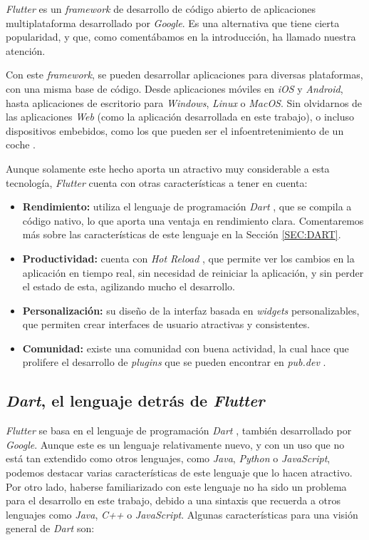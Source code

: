 \textit{Flutter} \cite{flutter} es un \textit{framework} de desarrollo de código abierto de aplicaciones multiplataforma desarrollado 
por \textit{Google}. Es una alternativa que tiene cierta popularidad, y que, como comentábamos en la introducción,
ha llamado nuestra atención.

Con este \textit{framework}, se pueden desarrollar aplicaciones para diversas plataformas, con una misma base de código.
Desde aplicaciones móviles en \textit{iOS} y \textit{Android}, hasta aplicaciones de escritorio para \textit{Windows}, \textit{Linux} o \textit{MacOS}. Sin olvidarnos de
las aplicaciones \textit{Web} (como la aplicación desarrollada en este trabajo), o incluso dispositivos 
embebidos, como los que pueden ser el infoentretenimiento de un coche \cite{flutter_car}. 

Aunque solamente este hecho aporta un atractivo muy considerable a esta tecnología, \textit{Flutter} cuenta con otras características a tener en cuenta:

\begin{itemize}
  \item \textbf{Rendimiento:} utiliza el lenguaje de programación \textit{Dart} \cite{dart}, que se compila a código nativo, lo que aporta una ventaja en rendimiento clara.
   Comentaremos más sobre las características de este lenguaje en la Sección \ref{SEC:DART}.
  \item \textbf{Productividad:} cuenta con \textit{Hot Reload} \cite{hot_reload}, que permite ver los cambios en la aplicación en tiempo real, sin necesidad de reiniciar 
  la aplicación, y sin perder el estado de esta, agilizando mucho el desarrollo.
  \item \textbf{Personalización:} su diseño de la interfaz basada en \textit{widgets} personalizables, que permiten crear interfaces de usuario atractivas y consistentes.
  \item \textbf{Comunidad:} existe una comunidad con buena actividad, la cual hace que prolifere el desarrollo de \textit{plugins} que se pueden encontrar en \textit{pub.dev} \cite{pub_dev}.
\end{itemize}


\subsection{\textit{Dart}, el lenguaje detrás de \textit{Flutter}\label{SEC:DART}}

\textit{Flutter} se basa en el lenguaje de programación \textit{Dart} \cite{dart}, 
también desarrollado por \textit{Google}. Aunque este es un lenguaje relativamente nuevo, y con 
un uso que no está tan extendido como otros lenguajes, como \textit{Java}, \textit{Python} o \textit{JavaScript},
podemos destacar varias características de este lenguaje que lo hacen atractivo. Por otro lado, haberse familiarizado
con este lenguaje no ha sido un problema para el desarrollo en este trabajo, debido a una sintaxis que 
recuerda a otros lenguajes como \textit{Java}, \textit{C++} o \textit{JavaScript}. Algunas características 
para una visión general de \textit{Dart} \cite{dart_overview} son:

